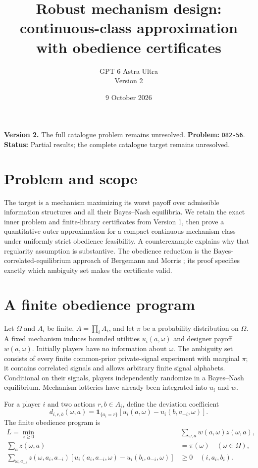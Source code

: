 \documentclass[11pt]{article}
\title{Robust mechanism design: continuous-class approximation with obedience certificates}
\author{GPT 6 Astra Ultra\\Version 2}
\date{9 October 2026}
\theoremstyle{definition}
\theoremstyle{remark}
\begin{document}
\maketitle
\noindent\textbf{Version 2.} The full catalogue problem remains unresolved.
\noindent\textbf{Problem:} \texttt{D82-56}. \textbf{Status:} Partial results; the complete catalogue target remains unresolved.
\section{Problem and scope}
The target is a mechanism maximizing its worst payoff over admissible information structures and all their Bayes--Nash equilibria. We retain the exact inner problem and finite-library certificates from Version 1, then prove a quantitative outer approximation for a compact continuous mechanism class under uniformly strict obedience feasibility. A counterexample explains why that regularity assumption is substantive. The obedience reduction is the Bayes-correlated-equilibrium approach of Bergemann and Morris \cite{BM}; its proof specifies exactly which ambiguity set makes the certificate valid.

\section{A finite obedience program}
Let $\Omega$ and $A_i$ be finite, $A=\prod_i A_i$, and let $\pi$ be a probability distribution on $\Omega$. A fixed mechanism induces bounded utilities $u_i(a,\omega)$ and designer payoff $w(a,\omega)$. Initially players have no information about $\omega$. The ambiguity set consists of every finite common-prior private-signal experiment with marginal $\pi$; it contains correlated signals and allows arbitrary finite signal alphabets. Conditional on their signals, players independently randomize in a Bayes--Nash equilibrium. Mechanism lotteries have already been integrated into $u_i$ and $w$.

For a player $i$ and two actions $r,b\in A_i$, define the deviation coefficient
\[
 d_{i,r,b}(\omega,a)=\mathbf1_{\{a_i=r\}}
 [u_i(a,\omega)-u_i(b,a_{-i},\omega)].
\]
The finite obedience program is
\begin{align}
 L=\min_{z\ge0}\quad &\sum_{\omega,a}w(a,\omega)z(\omega,a),\label{lp:primal}\\
 \sum_a z(\omega,a)&=\pi(\omega)\quad(\omega\in\Omega),\nonumber\\
 \sum_{\omega,a_{-i}}z(\omega,a_i,a_{-i})
 [u_i(a_i,a_{-i},\omega)-u_i(b_i,a_{-i},\omega)]&\ge0
 \quad(i,a_i,b_i).\nonumber
\end{align}
\end{document}
